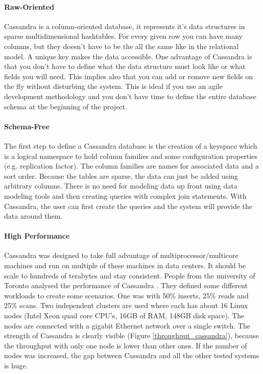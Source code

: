 \documentclass[a4paper]{article}
\begin{document}
\paragraph{Raw-Oriented}
Cassandra is a column-oriented database, it represents it's data structures in sparse multidimensional hashtables. For every given row you can have many columns, but they doesn't have to be the all the same like in the relational model. A unique key makes the data accessible. One advantage of Cassandra is that you don't have to define what the data structure must look like or what fields you will need. This implies also that you can add or remove new fields on the fly without disturbing the system. This is ideal if you use an agile development methodology and you don't have time to define the entire database schema at the beginning of the project.

\paragraph{Schema-Free}
The first step to define a Cassandra database is the creation of a keyspace which is a logical namespace to hold column families and some configuration properties (e.g. replication factor). The column families are names for associated data and a sort order. Because the tables are sparse, the data can just be added using arbitrary columns. There is no need for modeling data up front using data modeling tools and then creating queries with complex join statements. With Cassandra, the user can first create the queries and the system will provide the data around them.

\paragraph{High Performance}
Cassandra was designed to take full advantage of multiprocessor/multicore machines and run on multiple of these machines in data centers. It should be scale to hundreds of terabytes and stay consistent. People from the university of Toronto analysed the performance of Cassandra \cite{rabEtAl2012}. They defined some different workloads to create some scenarios. One was with 50\% inserts, 25\% reads and 25\% scans. Two independent clusters are used where each has about 16 Linux nodes (Intel Xeon quad core CPU's, 16GB of RAM, 148GB disk space). The nodes are connected with a gigabit Ethernet network over a single switch. The strength of Cassandra is clearly visible (Figure \ref{throughput_cassandra}), because the throughput with only one node is lower than other ones. If the number of nodes was increased, the gap between Cassandra and all the other tested systems is huge.
\end{document}
